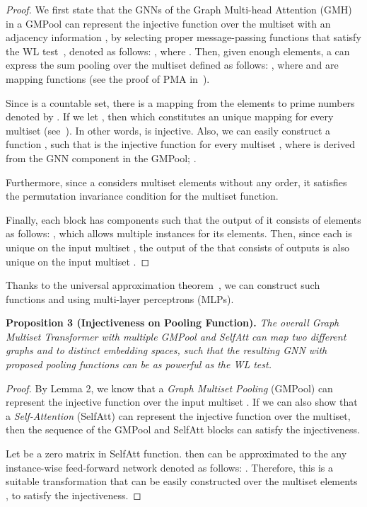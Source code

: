 \documentclass{article} \usepackage{iclr2021_conference,times}
\begin{document}
\begin{proof}
We first state that the GNNs of the Graph Multi-head Attention (GMH) in a GMPool can represent the injective function over the multiset  with an adjacency information , by selecting proper message-passing functions that satisfy the WL test~\citep{GIN, WL/GNN}, denoted as follows: , where . Then, given enough elements, a  can express the sum pooling over the multiset  defined as follows: , where  and  are mapping functions (see the proof of PMA in~\citet{SetTransformer}). 


Since  is a countable set, there is a mapping from the elements to prime numbers denoted by . If we let , then  which constitutes an unique mapping for every multiset  (see~\citet{multiset/injective}). In other words,  is injective. Also, we can easily construct a function , such that  is the injective function for every multiset , where  is derived from the GNN component in the GMPool; .

Furthermore, since a  considers multiset elements without any order, it satisfies the permutation invariance condition for the multiset function.

Finally, each  block has  components such that the output of it consists of  elements as follows: , which allows multiple instances for its elements. Then, since each  is unique on the input multiset , the output of the  that consists of  outputs is also unique on the input multiset .
\end{proof}

Thanks to the universal approximation theorem~\citep{univ/approx}, we can construct such functions  and  using multi-layer perceptrons (MLPs).


\textbf{Proposition 3 (Injectiveness on Pooling Function).} 
\emph{The overall Graph Multiset Transformer with multiple GMPool and SelfAtt can map two different graphs  and  to distinct embedding spaces, such that the resulting GNN with proposed pooling functions can be as powerful as the WL test.}

\begin{proof}
By Lemma 2, we know that a \emph{Graph Multiset Pooling} (GMPool) can represent the injective function over the input multiset . If we can also show that a \emph{Self-Attention} (SelfAtt) can represent the injective function over the multiset, then the sequence of the GMPool and SelfAtt blocks can satisfy the injectiveness.

Let  be a zero matrix in SelfAtt function.  then can be approximated to the any instance-wise feed-forward network denoted as follows: . Therefore, this  is a suitable transformation  that can be easily constructed over the multiset elements , to satisfy the injectiveness.
\end{proof}
\end{document}
